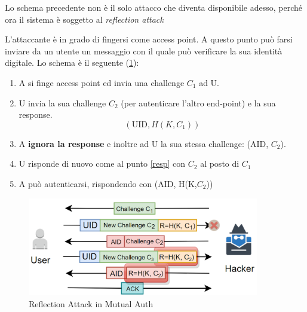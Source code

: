 Lo schema precedente non è il solo attacco che diventa disponibile adesso, perché ora il sistema è soggetto al \textit{reflection attack}
\begin{definition}
\label{def:reflectionatk}
L'attaccante è in grado di fingersi come access point. A questo punto può farsi inviare da un utente un messaggio con il quale può verificare la sua identità digitale. Lo schema è il seguente (\cref{fig:reflectionatk}): 
\begin{enumerate}
    \item A si finge access point ed invia una challenge $C_1$ ad U. 
    \item U invia la sua challenge $C_2$ (per autenticare l'altro end-point) e la sua response.\label{resp}
    \[(\text{UID}, H(K,C_1))\]
    \item A \textbf{ignora la response} e inoltre ad U la sua stessa challenge: (AID, $C_2$).
    \item U risponde di nuovo come al punto \ref{resp} con $C_2$ al posto di $C_1$
    \item A può autenticarsi, rispondendo con (AID, H(K,$C_2$))
\end{enumerate}
\end{definition}
\begin{figure}[h]
    \centering
    \includegraphics[width=0.9\textwidth]{image/reflectionatk.png}
    \caption{Reflection Attack in Mutual Auth}
    \label{fig:reflectionatk}
    \vspace{5pt}
\end{figure}
